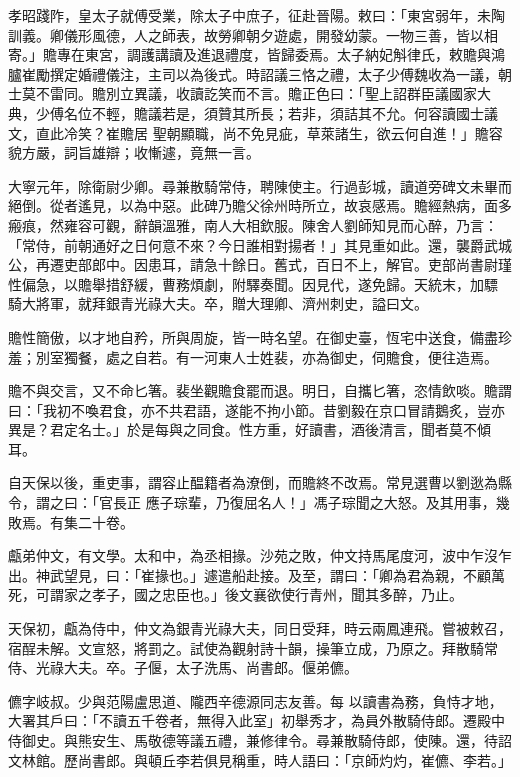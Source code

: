 \begin{pinyinscope}
 孝昭踐阼，皇太子就傅受業，除太子中庶子，征赴晉陽。敕曰：「東宮弱年，未陶訓義。卿儀形風德，人之師表，故勞卿朝夕遊處，開發幼蒙。一物三善，皆以相寄。」贍專在東宮，調護講讀及進退禮度，皆歸委焉。太子納妃斛律氏，敕贍與鴻臚崔勵撰定婚禮儀注，主司以為後式。時詔議三恪之禮，太子少傅魏收為一議，朝士莫不雷同。贍別立異議，收讀訖笑而不言。贍正色曰：「聖上詔群臣議國家大典，少傅名位不輕，贍議若是，須贊其所長；若非，須詰其不允。何容讀國士議文，直此冷笑？崔贍居
 聖朝顯職，尚不免見疵，草萊諸生，欲云何自進！」贍容貌方嚴，詞旨雄辯；收慚遽，竟無一言。



 大寧元年，除衛尉少卿。尋兼散騎常侍，聘陳使主。行過彭城，讀道旁碑文未畢而絕倒。從者遙見，以為中惡。此碑乃贍父徐州時所立，故哀感焉。贍經熱病，面多瘢痕，然雍容可觀，辭韻溫雅，南人大相欽服。陳舍人劉師知見而心醉，乃言：「常侍，前朝通好之日何意不來？今日誰相對揚者！」其見重如此。還，襲爵武城公，再遷吏部郎中。因患耳，請急十餘日。舊式，百日不上，解官。吏部尚書尉瑾性偏急，以贍舉措舒緩，曹務煩劇，附驛奏聞。因見代，遂免歸。天統末，加驃
 騎大將軍，就拜銀青光祿大夫。卒，贈大理卿、濟州刺史，謚曰文。



 贍性簡傲，以才地自矜，所與周旋，皆一時名望。在御史臺，恆宅中送食，備盡珍羞；別室獨餐，處之自若。有一河東人士姓裴，亦為御史，伺贍食，便往造焉。



 贍不與交言，又不命匕箸。裴坐觀贍食罷而退。明日，自攜匕箸，恣情飲啖。贍謂曰：「我初不喚君食，亦不共君語，遂能不拘小節。昔劉毅在京口冒請鵝炙，豈亦異是？君定名士。」於是每與之同食。性方重，好讀書，酒後清言，聞者莫不傾耳。



 自天保以後，重吏事，謂容止醖籍者為潦倒，而贍終不改焉。常見選曹以劉逖為縣令，謂之曰：「官長正
 應子琮輩，乃復屈名人！」馮子琮聞之大怒。及其用事，幾敗焉。有集二十卷。



 甗弟仲文，有文學。太和中，為丞相掾。沙苑之敗，仲文持馬尾度河，波中乍沒乍出。神武望見，曰：「崔掾也。」遽遣船赴接。及至，謂曰：「卿為君為親，不顧萬死，可謂家之孝子，國之忠臣也。」後文襄欲使行青州，聞其多醉，乃止。



 天保初，甗為侍中，仲文為銀青光祿大夫，同日受拜，時云兩鳳連飛。嘗被敕召，宿酲未解。文宣怒，將罰之。試使為觀射詩十韻，操筆立成，乃原之。拜散騎常侍、光祿大夫。卒。子偃，太子洗馬、尚書郎。偃弟儦。



 儦字岐叔。少與范陽盧思道、隴西辛德源同志友善。每
 以讀書為務，負恃才地，大署其戶曰：「不讀五千卷者，無得入此室」初舉秀才，為員外散騎侍郎。遷殿中侍御史。與熊安生、馬敬德等議五禮，兼修律令。尋兼散騎侍郎，使陳。還，待詔文林館。歷尚書郎。與頓丘李若俱見稱重，時人語曰：「京師灼灼，崔儦、李若。」




\end{pinyinscope}
